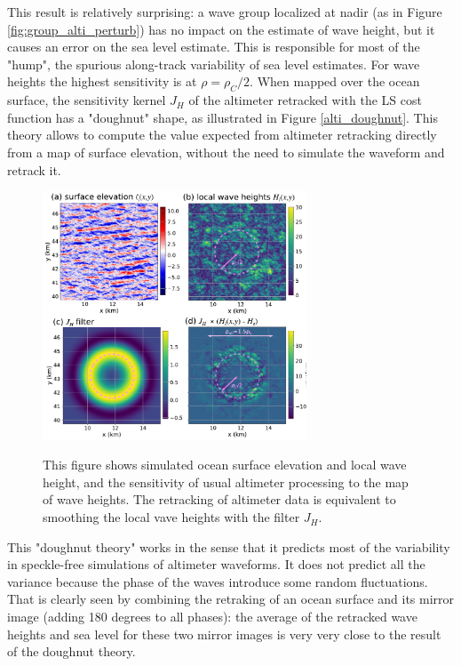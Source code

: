 This result is relatively surprising: a wave group localized at nadir (as in Figure \ref{fig:group_alti_perturb}) has no impact on the estimate of wave height, but it causes an error on the sea level estimate. This is responsible for most of the "hump", the spurious  along-track variability of sea level estimates. For wave heights the highest sensitivity is at $\rho=\rho_C/2$. When mapped over the ocean surface, the sensitivity kernel $J_H$ of the altimeter retracked with the LS cost function has a "doughnut" shape, as illustrated in Figure \ref{alti_doughnut}. This theory allows to compute the value expected from altimeter retracking directly from a map of surface elevation, without the need to simulate the waveform and retrack it. 
\begin{figure}[h!]
\centerline{\includegraphics[width=0.7\textwidth]{FIGS_CH_SAT/doughnut-footprint-for-altimeters.png}}
  \caption{This figure shows simulated ocean surface elevation and local wave height, and the sensitivity of usual altimeter processing to the map of wave heights. The retracking of altimeter data is equivalent to smoothing the local vave heights with the filter $J_H$.}{} \label{fig:alti_doughnut}
\end{figure}
This "doughnut theory" works in the sense that it predicts most of the variability in speckle-free simulations of altimeter waveforms. It does not predict all the variance because the phase of the waves introduce some random fluctuations. That is clearly seen by combining the retraking of an ocean surface and its mirror image (adding 180 degrees to all phases): the average of the retracked wave heights and sea level for these two mirror images is very very close to the result of the doughnut theory. 
